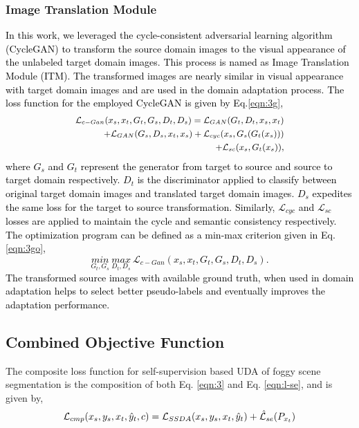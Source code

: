 \documentclass[final,5p,times,twocolumn]{elsarticle}
\begin{document}
\subsubsection{Image Translation Module}
\textcolor{black}{
In this work, we leveraged the cycle-consistent adversarial learning algorithm (CycleGAN) \cite{hoffman2017cycada} to transform the source domain images to the visual appearance of the unlabeled target domain images. This process is named as Image Translation Module (ITM). The transformed images are nearly similar in visual appearance with target domain images and are used in the domain adaptation process. 
The loss function for the employed CycleGAN is given by Eq.\ref{eqn:3g},
\begin{equation}
\small
\centering
\begin{split}
    \mathcal{L}_{c-Gan} ( x_s, x_t, G_t, G_s, D_t, D_s) = \mathcal{L}_{GAN} (G_t,D_t,  x_s, x_t) \\
    + \mathcal{L}_{GAN} (G_s,D_s,  x_t, x_s) + \mathcal{L}_{cyc} (x_s, G_s(G_t(x_s))) \\
    + \mathcal{L}_{sc} (x_s, G_t(x_s)),
\end{split}
\label{eqn:3g}
\end{equation}
where $G_s$ and $G_t$ represent the generator from target to source and source to target domain respectively. $D_t$ is the discriminator applied to classify between original target domain images and translated target domain images. $D_s$ expedites the same loss for the target to source transformation. Similarly, $\mathcal{L}_{cyc}$ and $\mathcal{L}_{sc}$ losses are applied to maintain the cycle and semantic consistency respectively. The optimization program can be defined as a min-max criterion given in Eq. \ref{eqn:3go},
\begin{equation}
\underset{G_t, G_s} {min}  ~\underset{D_t, D_s} {max} ~\mathcal{L}_{c-Gan} ( x_s, x_t, G_t, G_s, D_t, D_s).
\label{eqn:3go}
\end{equation}
The transformed source images with available ground truth, when used in domain adaptation helps to select better pseudo-labels and eventually improves the adaptation performance.}
\subsection{Combined Objective Function}

The composite loss function for self-supervision based UDA of foggy scene segmentation is the composition of both Eq. \ref{eqn:3} and Eq. \ref{eqn:l-se}, and is given by,  \begin{equation}
\small
\mathcal{L}_{cmp} (x_s, y_s, x_t, \hat{y}_t, c) = \mathcal{L}_{SSDA} ( x_s, y_s, x_t, \hat{y}_t) + \hat{\mathcal{L}}_{se} (P_{x_t})
\label{eqn:5}
\end{equation}
\end{document}
